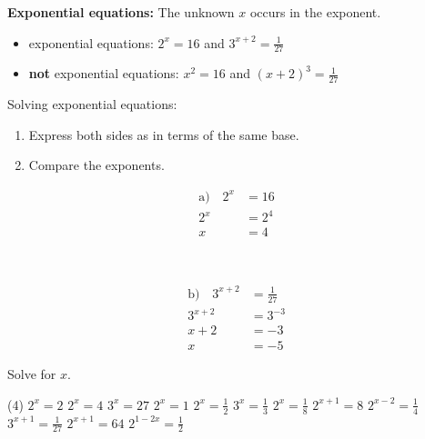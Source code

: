 \begin{tcolorbox}
	\textbf{Exponential equations:} The unknown $x$ occurs in the exponent.
	\begin{itemize}
		\item exponential equations: $2^x=16$ and $3^{x+2}=\frac{1}{27}$
		\item \textbf{not} exponential equations: $x^2=16$ and $\left(x+2\right)^3=\frac{1}{27}$
	\end{itemize}
	Solving exponential equations:
	\begin{enumerate}[Step 1:]
		\item Express both sides as in terms of the same base.
		\item Compare the exponents.
	\end{enumerate}
\end{tcolorbox}
\pagebreak[4]
\begin{exampleenv}
\begin{example}
	\begin{minipage}{0.45\textwidth}
		\begin{align*}
			\textrm{a)}\quad 2^x&=16 \\
			2^x&=2^4 \\
			x&=4 \\
			\phantom{x+2}& \\
			\phantom{x+2}&
		\end{align*}
	\end{minipage}\hfill
	\begin{minipage}{0.45\textwidth}
		\begin{align*}
			\textrm{b)}\quad 3^{x+2}&=\frac{1}{27} \\
			3^{x+2}&=3^{-3} \\
			x+2&=-3 \\
			x&=-5
		\end{align*}
	\end{minipage}
\end{example}
\end{exampleenv}
\begin{exercise}
	Solve for $x$.
	\begin{tasks}(4)
		\task $2^x=2$ \task $2^x=4$ \task $3^x=27$ \task $2^x=1$
		\task $2^x=\frac{1}{2}$ \task $3^x=\frac{1}{3}$ \task $2^x=\frac{1}{8}$ \task $2^{x+1}=8$
		\task $2^{x-2}=\frac{1}{4}$ \task $3^{x+1}=\frac{1}{27}$ \task $2^{x+1}=64$
		\task $2^{1-2x}=\frac{1}{2}$
	\end{tasks}
\end{exercise}
